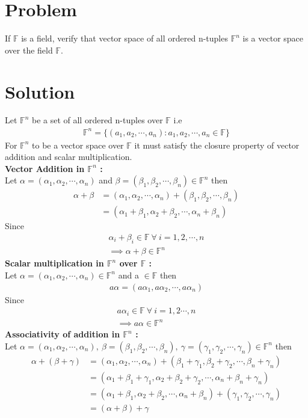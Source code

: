 \documentclass[journal,12pt,twocolumn]{IEEEtran}
\begin{document}
\section{Problem}
If $\mathbb{F}$ is a field, verify that vector space of all ordered n-tuples $\mathbb{F}^n$ is a 
vector space over the field $\mathbb{F}$.
\section{Solution}
Let $\mathbb{F}^n$ be a set of all ordered n-tuples over $\mathbb{F}$ i.e
\begin{align}
	\mathbb{F}^n= \{(a_1,a_2,\cdots,a_n) : a_1,a_2,\cdots,a_n \in \mathbb{F} \}
\end{align}
For $\mathbb{F}^n$ to be a vector space over $\mathbb{F}$ it must satisfy the closure property 
of vector addition and scalar multiplication. \\
{\bf Vector Addition in $\mathbb{F}^n$ :} \\
Let $\alpha = (\alpha_1,\alpha_2,\cdots,\alpha_n)$ and
$\beta = (\beta_1,\beta_2,\cdots,\beta_n) \in \mathbb{F}^n$ then 
\begin{align}
	\alpha + \beta &= (\alpha_1,\alpha_2,\cdots,\alpha_n) + (\beta_1,\beta_2,\cdots,\beta_n) \\
		       &= (\alpha_1+\beta_1,\alpha_2+\beta_2,\cdots,\alpha_n+\beta_n) 
\end{align}
Since 
\begin{align}
	\alpha_i+\beta_i \in \mathbb{F} \ \forall \  i=1,2,\cdots,n \\
	\implies \alpha+\beta \in \mathbb{F}^n
\end{align}
{\bf Scalar multiplication in $\mathbb{F}^n$ over $\mathbb{F}$ :} \\
Let $\alpha = (\alpha_1,\alpha_2,\cdots,\alpha_n) \in \mathbb{F}^n$ and a $\in \mathbb{F}$ then
\begin{align}
	a\alpha=(a\alpha_1,a\alpha_2,\cdots,a\alpha_n)
\end{align}
Since
\begin{align}
	a\alpha_i \in \mathbb{F} \ \forall \ i=1,2\cdots,n \\
	\implies a\alpha \in \mathbb{F}^n
\end{align}
{\bf Associativity of addition in $\mathbb{F}^n$ :} \\
Let $\alpha=(\alpha_1,\alpha_2,\cdots,\alpha_n), \ \beta=(\beta_1,\beta_2,\cdots,\beta_n), 
\ \gamma=(\gamma_1,\gamma_2,\cdots,\gamma_n) \in \mathbb{F}^n$ then
\begin{align}
	\alpha+(\beta+\gamma) &= (\alpha_1,\alpha_2,\cdots,\alpha_n) + (\beta_1+\gamma_1,\beta_2+\gamma_2,\cdots,\beta_n+\gamma_n) \\
	&= (\alpha_1+\beta_1+\gamma_1,\alpha_2+\beta_2+\gamma_2,\cdots,\alpha_n+\beta_n+\gamma_n) \\
	&= (\alpha_1+\beta_1,\alpha_2+\beta_2,\cdots,\alpha_n+\beta_n) + (\gamma_1,\gamma_2,\cdots,\gamma_n) \\
	&=(\alpha+\beta)+\gamma
\end{align}
\end{document}
